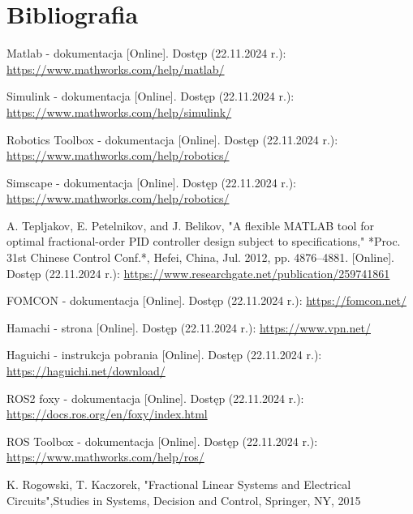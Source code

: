 \documentclass[journal,twoside,web]{ieeecolor}
\begin{document}
\section{Bibliografia}
\begin{thebibliography}{00}
	 Matlab - dokumentacja [Online]. Dostęp (22.11.2024 r.):
	\href{https://www.mathworks.com/help/matlab/}{https://www.mathworks.com/help/matlab/}
	
	 Simulink - dokumentacja [Online]. Dostęp (22.11.2024 r.): \href{https://www.mathworks.com/help/simulink/}{https://www.mathworks.com/help/simulink/}
	
	 Robotics Toolbox - dokumentacja [Online]. Dostęp (22.11.2024 r.):
	\href{https://www.mathworks.com/help/robotics/}{https://www.mathworks.com/help/robotics/}
	
	 Simscape - dokumentacja [Online]. Dostęp (22.11.2024 r.):
	\href{https://www.mathworks.com/help/robotics/}{https://www.mathworks.com/help/robotics/}
	
	 A. Tepljakov, E. Petelnikov, and J. Belikov, "A flexible MATLAB tool for optimal fractional-order PID controller design subject to specifications," *Proc. 31st Chinese Control Conf.*, Hefei, China, Jul. 2012, pp. 4876–4881. [Online]. Dostęp (22.11.2024 r.): \href{https://www.researchgate.net/publication/259741861_A_Flexible_MATLAB_Tool_for_Optimal_Fractional-order_PID_Controller_Design_Subject_to_Specifications}{https://www.researchgate.net/publication/259741861}
	
	 FOMCON - dokumentacja [Online]. Dostęp (22.11.2024 r.):
	\href{https://fomcon.net/}{https://fomcon.net/}
	
	 Hamachi - strona [Online]. Dostęp (22.11.2024 r.):
	\href{https://www.vpn.net/}{https://www.vpn.net/}
	
	 Haguichi - instrukcja pobrania [Online]. Dostęp (22.11.2024 r.):
	\href{https://haguichi.net/download/}{https://haguichi.net/download/}
	
	 ROS2 foxy - dokumentacja [Online]. Dostęp (22.11.2024 r.):
	\href{https://docs.ros.org/en/foxy/index.html}{https://docs.ros.org/en/foxy/index.html}
	
	 ROS Toolbox - dokumentacja [Online]. Dostęp (22.11.2024 r.):
	\href{https://www.mathworks.com/help/ros/}{https://www.mathworks.com/help/ros/}
	
	K. Rogowski, T. Kaczorek, "Fractional Linear Systems and Electrical Circuits",Studies in Systems, Decision and Control, Springer, NY, 2015
	

\end{thebibliography}
\end{document}
